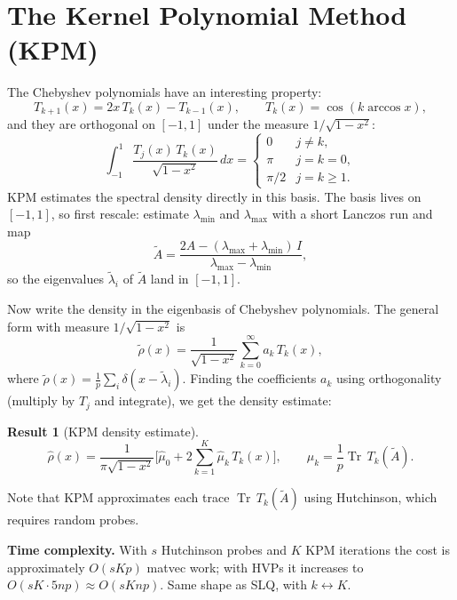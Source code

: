 \documentclass[11pt]{article}
\newtheorem*{resultbox}{Result}
\newcommand{\Tr}{\operatorname{Tr}}
\begin{document}
\section{The Kernel Polynomial Method (KPM)}

The Chebyshev polynomials have an interesting property:
\[
T_{k+1}(x) = 2x\,T_k(x) - T_{k-1}(x), \qquad T_k(x) = \cos(k \arccos x),
\]
and they are orthogonal on $[-1, 1]$ under the measure $1/\sqrt{1-x^2}$:
\[
\int_{-1}^{1} \frac{T_j(x)\, T_k(x)}{\sqrt{1-x^2}}\, dx =
\begin{cases} 0 & j \ne k, \\ \pi & j = k = 0, \\ \pi/2 & j = k \ge 1. \end{cases}
\]
KPM estimates the spectral density directly in this basis. The basis lives on $[-1, 1]$, so first rescale: estimate $\lambda_{\min}$ and $\lambda_{\max}$ with a short Lanczos run and map
\[
\tilde A = \frac{2A - (\lambda_{\max} + \lambda_{\min})\, I}{\lambda_{\max} - \lambda_{\min}},
\]
so the eigenvalues $\tilde\lambda_i$ of $\tilde A$ land in $[-1, 1]$.

Now write the density in the eigenbasis of Chebyshev polynomials. The general form with measure $1/\sqrt{1-x^2}$ is
\[
\tilde\rho(x) = \frac{1}{\sqrt{1-x^2}} \sum_{k=0}^{\infty} a_k\, T_k(x),
\]
where $\tilde\rho(x) = \frac1p \sum_i \delta(x - \tilde\lambda_i)$. Finding the coefficients $a_k$ using orthogonality (multiply by $T_j$ and integrate), we get the density estimate:

\begin{resultbox}[KPM density estimate]
\[
\hat\rho(x) = \frac{1}{\pi\sqrt{1 - x^2}} \Big[ \hat\mu_0 + 2 \sum_{k=1}^{K} \hat\mu_k\, T_k(x) \Big],
\qquad
\mu_k = \frac{1}{p} \Tr\, T_k(\tilde A) .
\]
\end{resultbox}

Note that KPM approximates each trace $\Tr\, T_k(\tilde A)$ using Hutchinson, which requires random probes.

\textbf{Time complexity.} With $s$ Hutchinson probes and $K$ KPM iterations the cost is approximately $O(sKp)$ matvec work; with HVPs it increases to $O(sK \cdot 5np) \approx O(sKnp)$. Same shape as SLQ, with $k \leftrightarrow K$.

\end{document}
